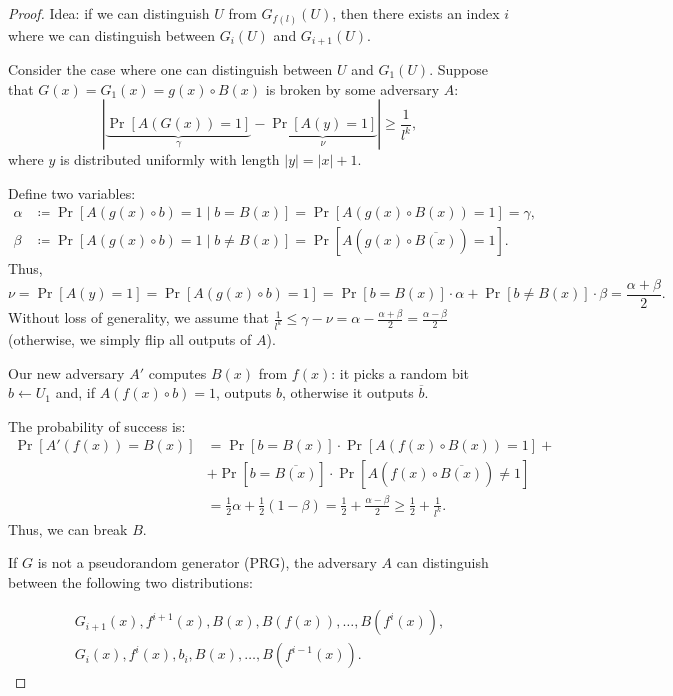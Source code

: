 \begin{proof}
  Idea: if we can distinguish $U$ from $G_{f(l)}(U)$, then there exists an index $i$ where we can distinguish between $G_i(U)$ and $G_{i + 1}(U)$.

  Consider the case where one can distinguish between $U$ and $G_{1}(U)$.
  Suppose that $G(x) = G_1(x) = g(x) \circ B(x)$ is broken by some adversary $A$:
   \[
	   \left| \underbrace{\Pr[A(G(x)) = 1]}_{\gamma} - \underbrace{\Pr[A(y) = 1]}_{\nu} \right| \ge \frac{1}{l^{k}}
  ,\] 
  where $y$ is distributed uniformly with length $|y| = |x| + 1$.
  
  Define two variables:
   \begin{align*}
	   \alpha &\coloneqq \Pr[A(g(x) \circ b) = 1  \mid b = B(x)] = \Pr[A(g(x) \circ B(x)) = 1] = \gamma,\\
	   \beta &\coloneqq \Pr[A(g(x) \circ b) = 1  \mid b \neq  B(x)] = \Pr[A(g(x) \circ \overline{B(x)}) = 1].
   \end{align*}
  Thus,
  \[
	  \nu = \Pr[A(y) = 1] = \Pr[A(g(x) \circ b) = 1] = \Pr[b = B(x)] \cdot \alpha + \Pr[b \neq B(x)] \cdot \beta = \frac{\alpha + \beta}{2}.
  \] 
  Without loss of generality, we assume that $\frac{1}{l^{k}} \le \gamma - \nu = \alpha - \frac{\alpha + \beta}{2} = \frac{\alpha - \beta}{2}$ (otherwise, we simply flip all outputs of $A$).
  
  Our new adversary $A'$ computes $B(x)$ from $f(x)$: it picks a random bit $b \gets U_1$ and, if $A(f(x) \circ b) = 1$, outputs $b$, otherwise it outputs $\overline{b}$.
  
  The probability of success is:
  \begin{align*}
	  \Pr[A'(f(x)) = B(x)] &= \Pr[b = B(x)] \cdot \Pr[A(f(x) \circ B(x)) = 1] + \\
						   &+ \Pr[b = \overline{B(x)}] \cdot \Pr[A(f(x) \circ \overline{B(x)}) \neq 1] \\
						   &= \frac{1}{2} \alpha + \frac{1}{2} (1 - \beta) = \frac{1}{2} + \frac{\alpha - \beta}{2} \ge  \frac{1}{2} + \frac{1}{l^{k}}.
  \end{align*}
	  Thus, we can break $B$.
	  
	If \( G \) is not a pseudorandom generator (PRG), the adversary \( A \) can distinguish between the following two distributions:
	
	\begin{align*}
	    G_{i+1}(x), f^{i+1}(x), B(x), B(f(x)), \dots, B(f^i(x)), \\
	    G_i(x), f^i(x), b_i, B(x), \dots, B(f^{i-1}(x)).
	\end{align*}
	

\end{proof}
